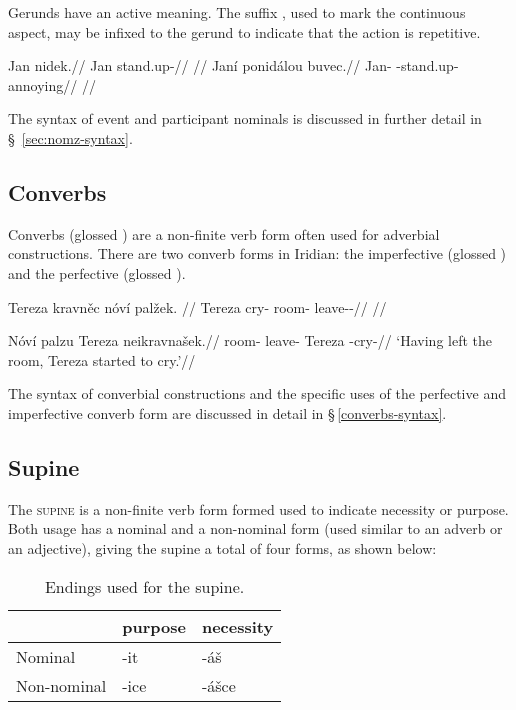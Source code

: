 Gerunds have an active meaning. The suffix , used to mark
the continuous aspect, may be infixed to the gerund to indicate that the action
is repetitive.

\pex
\a
\begingl
\gla Jan nidek.//
\glb Jan stand.up-//
\glft {}//
\endgl
\a
\begingl
\gla Janí ponidálou buvec.//
\glb Jan-\Gen{} -stand.up- annoying//
\glft {}//
\endgl
\xe

The syntax of event and participant nominals is discussed in further detail in
\S~\ref{sec:nomz-syntax}.

\subsection{Converbs}\label{sec:converb}

Converbs (glossed \Cv{}) are a non-finite verb form often used for adverbial
constructions. There are two converb forms in Iridian: the imperfective
 (glossed ) and the perfective
 (glossed ).

\pex
\begingl
\gla Tereza kravněc nóví palžek. //
\glb Tereza cry- room-\Gen{} leave-\Av{}-\Pf{}//
\glft {}//
\endgl
\xe

\pex
\begingl
\gla Nóví palzu Tereza neikravnašek.//
\glb room-\Gen{} leave- Tereza -cry-//
\glft `Having left the room, Tereza started to cry.'//
\endgl
\xe

The syntax of converbial constructions and the specific uses of the perfective
and imperfective converb form are discussed in detail in
\S\,\ref{converbs-syntax}.


\subsection{Supine}

The {\scshape supine} is a non-finite verb form formed used to
indicate necessity or purpose. Both usage has a nominal and a non-nominal form
(used similar to an adverb or an adjective), giving the supine a total of four
forms, as shown below:

\begin{table}[ht!]
	\sffamily\footnotesize
	\caption{Endings used for the supine.}
	\medskip
	\begin{tabu} to 0.6
		\toprule
		&{\sc purpose}&{\sc necessity}\\
		\midrule
		Nominal & {-it} & {-áš}\\
		Non-nominal & {-ice} & {-ášce}\\
		\bottomrule
	\end{tabu}
\end{table}

